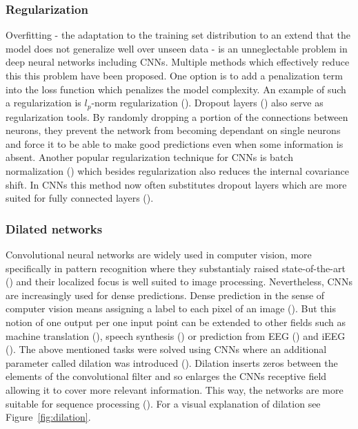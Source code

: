 \subsubsection{Regularization}
Overfitting - the adaptation to the training set distribution to an extend that the model does not generalize well over unseen data - is an unneglectable problem in deep neural networks including CNNs.
Multiple methods which effectively reduce this this problem have been proposed.
One option is to add a penalization term into the loss function which penalizes the model complexity.
An example of such a regularization is $l_p$-norm regularization (\cite{cnn-description}).
Dropout layers (\cite{drop-out}) also serve as regularization tools. 
By randomly dropping a portion of the connections between neurons, they prevent the network from becoming dependant on single neurons and force it to be able to make good predictions even when some information is absent.
Another popular regularization technique for CNNs is batch normalization (\cite{batch-norm}) which besides regularization also reduces the internal covariance shift. 
In CNNs this method now often substitutes dropout layers which are more suited for fully connected layers (\cite{cnn-description}).


\subsubsection{Dilated networks}\label{subsec:dilated-networks}
Convolutional neural networks are widely used in computer vision, more specifically in pattern recognition where they substantialy raised state-of-the-art (\cite{alexnet, dnn-computer-vision}) and their localized focus is well suited to image processing.
Nevertheless, CNNs are increasingly used for dense predictions.
Dense prediction in the sense of computer vision means assigning a label to each pixel of an image (\cite{dense-prediction-images}).
But this notion of one output per one input point can be extended to other fields such as machine translation (\cite{dense-prediction-machine-translation}), speech synthesis (\cite{angrick-speech-2018}) or prediction from EEG (\cite{schirrmeister-deep-2017}) and iEEG (\cite{Hammer-2021}).
The above mentioned tasks were solved using CNNs where an additional parameter called dilation was introduced (\cite{dense-prediction-images}).
Dilation inserts zeros between the elements of the convolutional filter and so enlarges the CNNs receptive field allowing it to cover more relevant information.
This way, the networks are more suitable for sequence processing (\cite{cnn-description}).
For a visual explanation of dilation see Figure~\ref{fig:dilation}.

